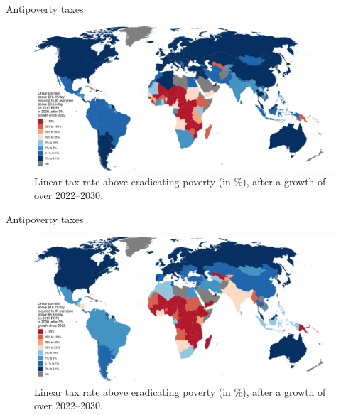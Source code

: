 \documentclass[aspectratio=169,xcolor=dvipsnames, 11pt,mathserif]{beamer}
\begin{document}
\begin{frame}{Antipoverty taxes}    
    \begin{figure}
      \caption{Linear tax rate above  eradicating  poverty (in \%), after a growth of  over 2022--2030. 
      }
      \includegraphics[height=.8\textheight]{../figures/antipoverty_4_tax_18_average.pdf}
    \end{figure}
\end{frame}

\begin{frame}{Antipoverty taxes}    
    \begin{figure}
      \caption{Linear tax rate above  eradicating  poverty (in \%), after a growth of  over 2022--2030. 
      }
      \includegraphics[height=.8\textheight]{../figures/antipoverty_7_tax_7_average.pdf}
    \end{figure}
\end{frame}
\end{document}
